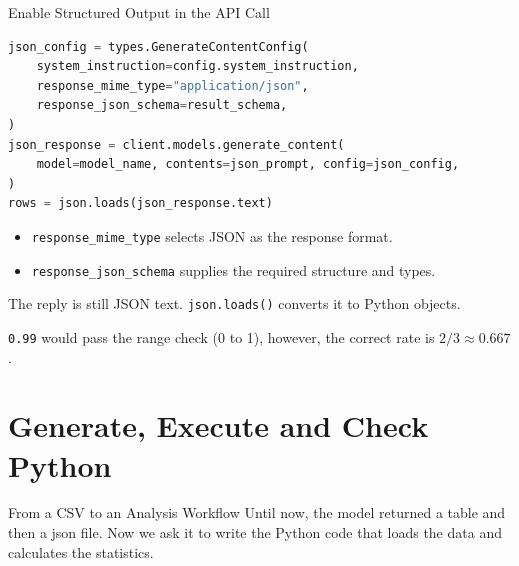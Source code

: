 \documentclass[aspectratio=169]{beamer}
\begin{document}
\begin{frame}[fragile]{Enable Structured Output in the API Call}
\begin{lstlisting}[language=Python]
json_config = types.GenerateContentConfig(
    system_instruction=config.system_instruction,
    response_mime_type="application/json",
    response_json_schema=result_schema,
)
json_response = client.models.generate_content(
    model=model_name, contents=json_prompt, config=json_config,
)
rows = json.loads(json_response.text)
\end{lstlisting}
  \begin{itemize}
    \item \texttt{response\_mime\_type} selects JSON as the response format.
    \item \texttt{response\_json\_schema} supplies the required structure and types.
  \end{itemize}
  \small The reply is still JSON text. \texttt{json.loads()} converts it to Python objects.
  \par\vspace{0.4em}
  \texttt{0.99} would pass the range check (0 to 1), however, the correct rate is $2/3 \approx 0.667$.
\end{frame}

\section{Generate, Execute and Check Python}

\begin{frame}{From a CSV to an Analysis Workflow}
  \small Until now, the model returned a table and then a json file.  Now we ask it to write the Python code that loads the data and calculates the statistics.
  \par\vspace{0.5em}
  \begin{center}
  \end{center}
\end{frame}
\end{document}
